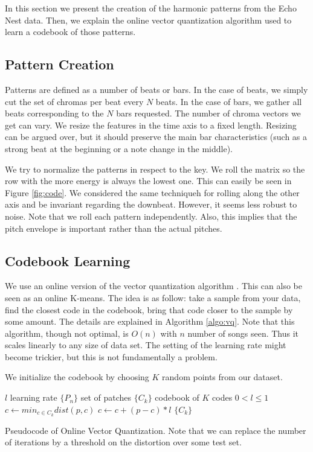 \documentclass{article}
\begin{document}
In this section we present the creation of the harmonic patterns from
the Echo Nest data. Then, we explain the online vector quantization algorithm
used to learn a codebook of those patterns.

\subsection{Pattern Creation}
Patterns are defined as a number of beats or bars. In the case of beats,
we simply cut the set of chromas per beat every $N$ beats. In the case
of bars, we gather all beats corresponding to the $N$ bars requested.
The number of chroma vectors we get can vary. We resize the features in the
time axis to a fixed length. Resizing can be argued over, but it should
preserve the main bar characteristics (such as a strong beat at the beginning
or a note change in the middle).

We try to normalize the patterns in respect to the key. We roll the matrix
so the row with the more energy is always the lowest one. This can easily be
seen in Figure \ref{fig:code}. We considered the same techniqueh for rolling
along the other axis and be invariant regarding the downbeat. However, it
seems less robust to noise. Note that we roll each pattern independently.
Also, this implies that the pitch envelope is important rather than the actual 
pitches.


\subsection{Codebook Learning}
We use an online version of the vector quantization algorithm 
\cite{Gersho1991}. This can also be seen as an online K-means.
The idea is as follow: take a sample from your data, find the closest
code in the codebook, bring that code closer to the sample by some amount.
The details are explained in Algorithm \ref{algo:vq}. Note that this
algorithm, though not optimal, is $O(n)$ with $n$ number of songs seen.
Thus it scales linearly to any size of data set. The setting of the learning
rate might become trickier, but this is not fundamentally a problem.

We initialize the codebook by choosing $K$ random points from our dataset.


\begin{algorithm}
\begin{algorithmic}
\STATE$l$ learning rate
\STATE$\{P_n\}$ set of patches
\STATE$\{C_k\}$ codebook of $K$ codes
\REQUIRE $0 < l \leq 1$
\STATE$c \leftarrow min_{c \in C_k} dist(p,c)$
\STATE$c \leftarrow c + (p - c) * l$
\ENDFOR
\ENDFOR
\RETURN $\{C_k\}$
\caption{\small{Pseudocode of Online Vector Quantization. Note that we can 
replace the number of iterations by a threshold on the distortion over some 
test set.}
\label{algo:vq}}
\end{algorithmic}
\end{algorithm}
\end{document}
